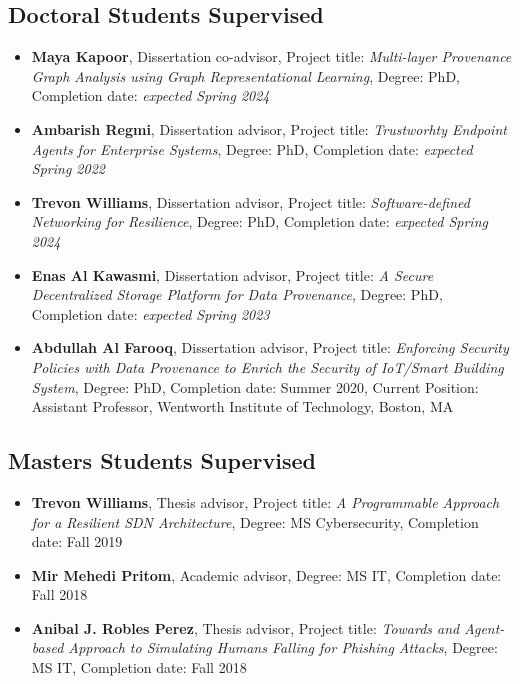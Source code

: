 
\hypertarget{phd-students}{%
\subsection{Doctoral Students Supervised}\label{phd-students}}

\begin{itemize}
\tightlist
\item \textbf{Maya Kapoor}, Dissertation co-advisor, Project title: \textit{Multi-layer Provenance Graph Analysis using Graph Representational Learning}, Degree: PhD, Completion date: \textit{expected Spring 2024}
\item \textbf{Ambarish Regmi}, Dissertation advisor, Project title: \textit{Trustworhty Endpoint Agents for Enterprise Systems}, Degree: PhD, Completion date: \textit{expected Spring 2022}
\item \textbf{Trevon Williams}, Dissertation advisor, Project title: \textit{Software-defined Networking for Resilience}, Degree: PhD, Completion date: \textit{expected Spring 2024}
\item \textbf{Enas Al Kawasmi}, Dissertation advisor, Project title: \textit{A Secure Decentralized Storage Platform for Data Provenance}, Degree: PhD, Completion date: \textit{expected Spring 2023}
\item \textbf{Abdullah Al Farooq}, Dissertation advisor, Project title: \textit{Enforcing Security Policies with Data Provenance to Enrich the Security of IoT/Smart Building System}, Degree: PhD, Completion date: Summer 2020, Current Position: Assistant Professor, Wentworth Institute of Technology, Boston, MA
\end{itemize}

\hypertarget{ms-students}{%
\subsection{Masters Students Supervised}\label{ms-students}}

\begin{itemize}
\tightlist
\item \textbf{Trevon Williams}, Thesis advisor, Project title: \textit{A Programmable Approach for a Resilient SDN Architecture}, Degree: MS Cybersecurity, Completion date: Fall 2019
\item \textbf{Mir Mehedi Pritom}, Academic advisor, Degree: MS IT, Completion date: Fall 2018
\item \textbf{Anibal J. Robles Perez}, Thesis advisor, Project title: \textit{Towards and Agent-based Approach to Simulating Humans Falling for Phishing Attacks}, Degree: MS IT, Completion date: Fall 2018
\end{itemize}

